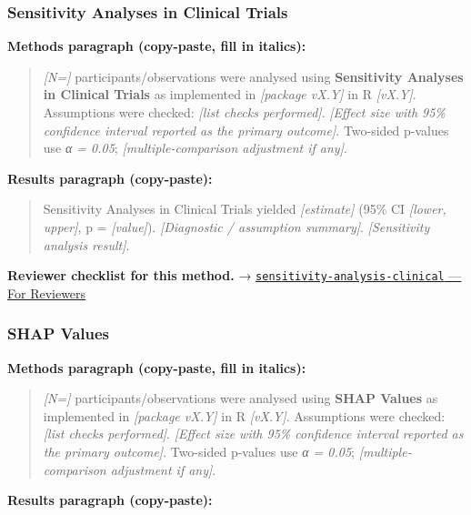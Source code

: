 \documentclass[
]{article}
\begin{document}
\subsubsection{Sensitivity Analyses in Clinical
Trials}\label{sensitivity-analyses-in-clinical-trials}

\textbf{Methods paragraph (copy-paste, fill in italics):}

\begin{quote}
\emph{{[}N={]}} participants/observations were analysed using
\textbf{Sensitivity Analyses in Clinical Trials} as implemented in
\emph{{[}package vX.Y{]}} in R \emph{{[}vX.Y{]}}. Assumptions were
checked: \emph{{[}list checks performed{]}}. \emph{{[}Effect size with
95\% confidence interval reported as the primary outcome{]}}. Two-sided
p-values use \emph{α = 0.05}; \emph{{[}multiple-comparison adjustment if
any{]}}.
\end{quote}

\textbf{Results paragraph (copy-paste):}

\begin{quote}
Sensitivity Analyses in Clinical Trials yielded \emph{{[}estimate{]}}
(95\% CI \emph{{[}lower, upper{]}}, p = \emph{{[}value{]}}).
\emph{{[}Diagnostic / assumption summary{]}}. \emph{{[}Sensitivity
analysis result{]}}.
\end{quote}

\textbf{Reviewer checklist for this method.} →
\href{../chapters/14-clinical/sensitivity-analysis-clinical.Rmd\#for-reviewers}{\texttt{sensitivity-analysis-clinical}
--- For Reviewers}

\subsubsection{SHAP Values}\label{shap-values}

\textbf{Methods paragraph (copy-paste, fill in italics):}

\begin{quote}
\emph{{[}N={]}} participants/observations were analysed using
\textbf{SHAP Values} as implemented in \emph{{[}package vX.Y{]}} in R
\emph{{[}vX.Y{]}}. Assumptions were checked: \emph{{[}list checks
performed{]}}. \emph{{[}Effect size with 95\% confidence interval
reported as the primary outcome{]}}. Two-sided p-values use \emph{α =
0.05}; \emph{{[}multiple-comparison adjustment if any{]}}.
\end{quote}

\textbf{Results paragraph (copy-paste):}
\end{document}
